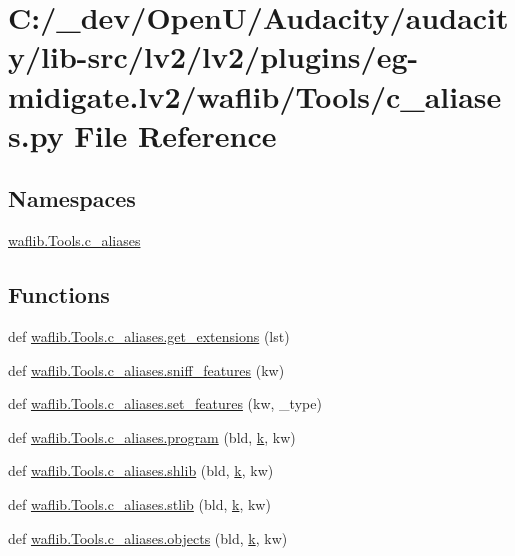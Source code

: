 \hypertarget{lv2_2plugins_2eg-midigate_8lv2_2waflib_2_tools_2c__aliases_8py}{}\section{C\+:/\+\_\+dev/\+Open\+U/\+Audacity/audacity/lib-\/src/lv2/lv2/plugins/eg-\/midigate.lv2/waflib/\+Tools/c\+\_\+aliases.py File Reference}
\label{lv2_2plugins_2eg-midigate_8lv2_2waflib_2_tools_2c__aliases_8py}
\subsection*{Namespaces}
\begin{DoxyCompactItemize}
\item 
 \hyperlink{namespacewaflib_1_1_tools_1_1c__aliases}{waflib.\+Tools.\+c\+\_\+aliases}
\end{DoxyCompactItemize}
\subsection*{Functions}
\begin{DoxyCompactItemize}
\item 
def \hyperlink{namespacewaflib_1_1_tools_1_1c__aliases_a2c236bc286989e7a4856c0c855d7867d}{waflib.\+Tools.\+c\+\_\+aliases.\+get\+\_\+extensions} (lst)
\item 
def \hyperlink{namespacewaflib_1_1_tools_1_1c__aliases_a5dc841eb61d3c43326b4c75f23c8f771}{waflib.\+Tools.\+c\+\_\+aliases.\+sniff\+\_\+features} (kw)
\item 
def \hyperlink{namespacewaflib_1_1_tools_1_1c__aliases_a9676c4aa7388b63dcb8146ee0b1eabb7}{waflib.\+Tools.\+c\+\_\+aliases.\+set\+\_\+features} (kw, \+\_\+type)
\item 
def \hyperlink{namespacewaflib_1_1_tools_1_1c__aliases_a37f66fad92eb3e5608e4ea6cc919987c}{waflib.\+Tools.\+c\+\_\+aliases.\+program} (bld, \hyperlink{rfft2d_test_m_l_8m_adc468c70fb574ebd07287b38d0d0676d}{k}, kw)
\item 
def \hyperlink{namespacewaflib_1_1_tools_1_1c__aliases_abe1769b56363a382ee98a9ffbd9fcc3c}{waflib.\+Tools.\+c\+\_\+aliases.\+shlib} (bld, \hyperlink{rfft2d_test_m_l_8m_adc468c70fb574ebd07287b38d0d0676d}{k}, kw)
\item 
def \hyperlink{namespacewaflib_1_1_tools_1_1c__aliases_ac17e9b8cf40b90cb8f7a0262e1b6208e}{waflib.\+Tools.\+c\+\_\+aliases.\+stlib} (bld, \hyperlink{rfft2d_test_m_l_8m_adc468c70fb574ebd07287b38d0d0676d}{k}, kw)
\item 
def \hyperlink{namespacewaflib_1_1_tools_1_1c__aliases_a7b447b92707b996e71d30214f7b28555}{waflib.\+Tools.\+c\+\_\+aliases.\+objects} (bld, \hyperlink{rfft2d_test_m_l_8m_adc468c70fb574ebd07287b38d0d0676d}{k}, kw)
\end{DoxyCompactItemize}
